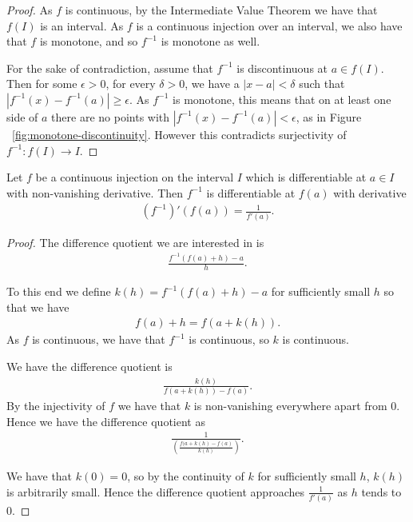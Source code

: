 \documentclass[]{article}
\begin{document}
\begin{proof}
		As $f$ is continuous, by the Intermediate Value Theorem we have that $f(I)$ is an interval. As $f$ is a continuous injection over an interval, we also have that $f$ is monotone, and so $f^{-1}$ is monotone as well. 

		For the sake of contradiction, assume that $f^{-1}$ is discontinuous at $a \in f(I)$. Then for some $\epsilon > 0$, for every $\delta > 0$, we have a $|x - a| < \delta$ such that  $|f^{-1}(x) - f^{-1}(a)| \geq \epsilon$. As  $f^{-1}$ is monotone, this means that on at least one side of $a$ there are no points with $|f^{-1}(x) - f^{-1}(a)| < \epsilon$, as in Figure ~\ref{fig:monotone-discontinuity}. However this contradicts surjectivity of $f^{-1}: f(I) \to I$.
\end{proof}

\begin{thm}
		Let $f$ be a continuous injection on the interval $I$ which is differentiable at $a \in I$ with non-vanishing derivative. Then $f^{-1}$ is differentiable at $f(a)$ with derivative
		\begin{align*}
				(f^{-1})'(f(a)) = \frac{1}{f'(a)}.				
		\end{align*}
\end{thm}

\begin{proof}
		The difference quotient we are interested in is 
		\begin{align*}
				\frac{f^{-1}(f(a) + h) - a}{h}.
		\end{align*}

		To this end we define $k(h) = f^{-1}(f(a) + h) - a$ for sufficiently small $h$ so that we have
		\begin{align*}
				f(a) + h = f(a + k(h)).
		\end{align*}
		As $f$ is continuous, we have that $f^{-1}$ is continuous, so $k$ is continuous.

		We have the difference quotient is 
		\begin{align*}
				\frac{k(h)}{f(a+k(h)) - f(a)}.
		\end{align*}
		By the injectivity of $f$ we have that $k$ is non-vanishing everywhere apart from $0$. Hence we have the difference quotient as
		\begin{align*}
				\frac{1}{\left(\frac{f(a+k(h)-f(a)}{k(h)}\right)}.
		\end{align*}

		We have that $k(0) = 0$, so by the continuity of $k$ for sufficiently small $h$, $k(h)$ is arbitrarily small. Hence the difference quotient approaches $\frac{1}{f'(a)}$ as $h$ tends to $0$.
\end{proof}
\end{document}
